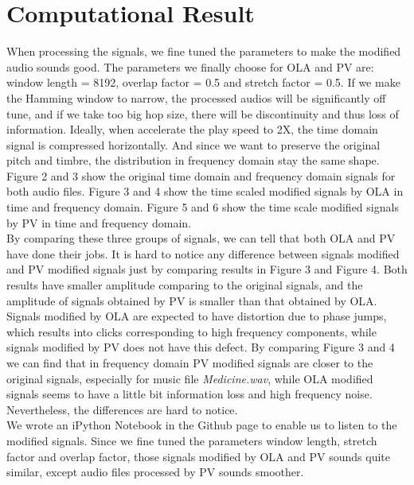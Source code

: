 \documentclass{article}
\begin{document}
\section{Computational Result}
When processing the signals, we fine tuned the parameters to make the modified audio sounds good. The parameters we finally choose for OLA and PV are: window length = 8192, overlap factor = 0.5 and stretch factor = 0.5. If we make the Hamming window to narrow, the processed audios will be significantly off tune, and if we take too big hop size, there will be discontinuity and thus loss of information.
Ideally, when accelerate the play speed to 2X, the time domain signal is compressed horizontally. And since we want to preserve the original pitch and timbre, the distribution in frequency domain stay the same shape.\\
Figure 2 and 3 show the original time domain and frequency domain signals for both audio files. Figure 3 and 4 show the time scaled modified signals by OLA in time and frequency domain. Figure 5 and 6 show the time scale modified signals by PV in time and frequency domain. \\
By comparing these three groups of signals, we can tell that both OLA and PV have done their jobs. It is hard to notice any difference between signals modified and PV modified signals just by comparing results in Figure 3 and Figure 4. Both results have smaller amplitude comparing to the original signals, and the amplitude of signals obtained by PV is smaller than that obtained by OLA. \\
Signals modified by OLA are expected to have distortion due to phase jumps, which results into clicks corresponding to high frequency components, while signals modified by PV does not have this defect. By comparing Figure 3 and 4 we can find that in frequency domain PV modified signals are closer to the original signals, especially for music file \textit{Medicine.wav}, while OLA modified signals seems to have a little bit information loss and high frequency noise. Nevertheless, the differences are hard to notice.\\
We wrote an iPython Notebook in the Github page to enable us to listen to the modified signals. Since we fine tuned the parameters window length, stretch factor and overlap factor, those signals modified by OLA and PV sounds quite similar, except audio files processed by PV sounds smoother. 
\end{document}
